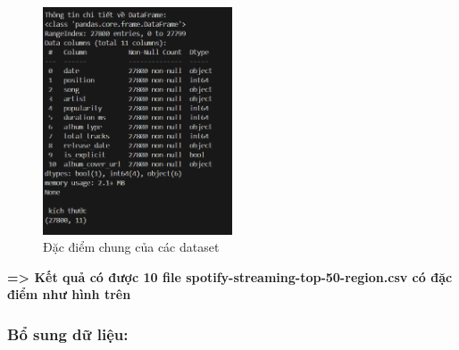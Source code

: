 \begin{figure}[h] %
    \centering %
    \includegraphics[width=0.5\textwidth]{../graphics/data_top50/raw.png} %
    \caption{Đặc điểm chung của các dataset} %
    \label{fig:example} %
\end{figure}
\textbf{=> Kết quả có được 10 file spotify-streaming-top-50-{region}.csv có đặc điểm như hình trên}

 \subsubsection{Bổ sung dữ liệu:}

